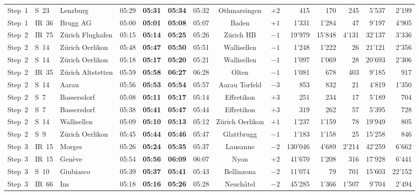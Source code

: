 \documentclass[preprint,12pt]{elsarticle}
\begin{document}
\begin{table}[!htb]
{\begin{tabular}{lllcccccrrrrrr}
Step~1 & S~23 & Lenzburg & 05:29 & \textbf{05:31} & \textbf{05:34} & 05:32 & Othmarsingen & \(+2\) & 415 & 170 & 245 & 5'537 & 2'199 \\
Step~1 & IR~36 & Brugg AG & 05:00 & \textbf{05:01} & \textbf{05:08} & 05:07 & Baden & \(+1\) & 1'331 & 1'284 & 47 & 9'197 & 4'905 \\
\midrule
Step~2 & IR~75 & Zürich Flughafen & 05:15 & \textbf{05:14} & \textbf{05:25} & 05:26 & Zürich HB & \(-1\) & 19'979 & 15'848 & 4'131 & 32'137 & 3'336 \\
Step~2 & S~14 & Zürich Oerlikon & 05:48 & \textbf{05:47} & \textbf{05:50} & 05:51 & Wallisellen & \(-1\) & 1'248 & 1'222 & 26 & 21'121 & 2'356 \\
Step~2 & S~14 & Zürich Oerlikon & 05:18 & \textbf{05:17} & \textbf{05:20} & 05:21 & Wallisellen & \(-1\) & 1'097 & 1'069 & 28 & 20'693 & 2'306 \\
Step~2 & IR~35 & Zürich Altstetten & 05:59 & \textbf{05:58} & \textbf{06:27} & 06:28 & Olten & \(-1\) & 1'081 & 678 & 403 & 9'185 & 917 \\
Step~2 & S~14 & Aarau & 05:56 & \textbf{05:53} & \textbf{05:54} & 05:57 & Aarau Torfeld & \(-3\) & 853 & 832 & 21 & 4'819 & 1'350 \\
Step~2 & S~7 & Bassersdorf & 05:08 & \textbf{05:11} & \textbf{05:17} & 05:14 & Effretikon & \(+3\) & 251 & 234 & 17 & 5'189 & 704 \\
Step~2 & S~7 & Bassersdorf & 05:38 & \textbf{05:41} & \textbf{05:47} & 05:44 & Effretikon & \(+3\) & 319 & 262 & 57 & 5'395 & 728 \\
Step~2 & S~14 & Wallisellen & 05:09 & \textbf{05:10} & \textbf{05:13} & 05:12 & Zürich Oerlikon & \(+1\) & 1'237 & 1'159 & 78 & 19'949 & 805 \\
Step~2 & S~9 & Zürich Oerlikon & 05:45 & \textbf{05:44} & \textbf{05:46} & 05:47 & Glattbrugg & \(-1\) & 1'183 & 1'158 & 25 & 15'258 & 846 \\
\midrule
Step~3 & IR~15 & Morges & 05:26 & \textbf{05:24} & \textbf{05:35} & 05:37 & Lausanne & \(-2\) & 130'046 & 4'689 & 2'214 & 42'259 & 6'662 \\
Step~3 & IR~15 & Genève & 05:54 & \textbf{05:56} & \textbf{06:09} & 06:07 & Nyon & \(+2\) & 41'670 & 1'208 & 316 & 17'928 & 6'441 \\
Step~3 & S~10 & Giubiasco & 05:39 & \textbf{05:37} & \textbf{05:41} & 05:43 & Bellinzona & \(-2\) & 11'074 & 79 & 701 & 15'603 & 22'152 \\
Step~3 & IR~66 & Ins & 05:18 & \textbf{05:16} & \textbf{05:26} & 05:28 & Neuchâtel & \(-2\) & 45'285 & 1'366 & 1'507 & 9'704 & 2'494 \\

\end{tabular}}
\end{table}
\end{document}
